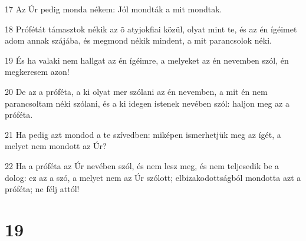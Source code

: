 \par 17 Az Úr pedig monda nékem: Jól mondták a mit mondtak.
\par 18 Prófétát támasztok nékik az õ atyjokfiai közül, olyat mint te, és az én ígéimet  adom annak szájába, és megmond nékik mindent, a mit parancsolok néki.
\par 19 És ha valaki nem hallgat az én ígéimre, a melyeket az én nevemben szól, én megkeresem azon!
\par 20 De az a próféta, a ki olyat mer szólani az én nevemben, a mit én nem parancsoltam néki szólani, és a ki idegen istenek nevében szól: haljon meg az a próféta.
\par 21 Ha pedig azt mondod a te szívedben: miképen ismerhetjük meg az ígét, a melyet nem mondott az Úr?
\par 22 Ha a próféta az Úr nevében szól, és nem lesz meg, és nem teljesedik be a dolog: ez az a szó, a melyet nem az Úr szólott; elbizakodottságból mondotta azt a próféta; ne félj attól!

\chapter{19}


